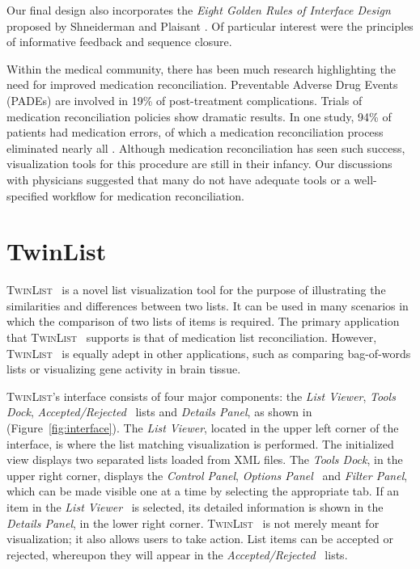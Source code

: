 \documentclass{chi2009}
\newcommand{\TwinList}{\textsc{TwinList}}
\newcommand{\ListViewer}{\textit{List Viewer}}
\newcommand{\AcceptedRejected}{\textit{Accepted/Rejected}}
\newcommand{\Details}{\textit{Details Panel}}
\newcommand{\Tools}{\textit{Tools Dock}}
\newcommand{\Controls}{\textit{Control Panel}}
\newcommand{\Filters}{\textit{Filter Panel}}
\newcommand{\Options}{\textit{Options Panel}}
\begin{document}
Our final design also incorporates the \textit{Eight Golden Rules of Interface Design} proposed by Shneiderman and Plaisant \cite{shneiderman}. Of particular interest were the principles of informative feedback and sequence closure.

Within the medical community, there has been much research \cite{JCAHO-2006} \cite{icutool03} highlighting the need for improved medication reconciliation. Preventable Adverse Drug Events (PADEs) are involved in 19\% of post-treatment complications. Trials of medication reconciliation policies show dramatic results. In one study, 94\% of patients had medication errors, of which a medication reconciliation process eliminated nearly all \cite{icutool03}. Although medication reconciliation has seen such  success, visualization tools for this procedure are still in their infancy. Our discussions with physicians suggested that many do not have adequate tools or a well-specified workflow for medication reconciliation. 

\section{TwinList}
\TwinList~ is a novel list visualization tool for the purpose of illustrating the similarities and differences between two lists. It can be used in many scenarios in which the comparison of two lists of items is required. The primary application that \TwinList~ supports is that of medication list reconciliation. However, \TwinList~ is equally adept in other applications, such as comparing bag-of-words lists or visualizing gene activity in brain tissue.

\TwinList's interface consists of four major components: the \ListViewer, \Tools, \AcceptedRejected~ lists and \Details, as shown in (Figure~\ref{fig:interface}). The \ListViewer, located in the upper left corner of the interface, is where the list matching visualization is performed. The initialized view displays two separated lists loaded from XML files. The \Tools, in the upper right corner, displays the \Controls, \Options~ and \Filters, which can be made visible one at a time by selecting the appropriate tab. If an item in the \ListViewer~ is selected, its detailed information is shown in the \Details, in the lower right corner. \TwinList~ is not merely meant for visualization; it also allows users to take action. List items can be accepted or rejected, whereupon they will appear in the \AcceptedRejected~ lists.
\end{document}
